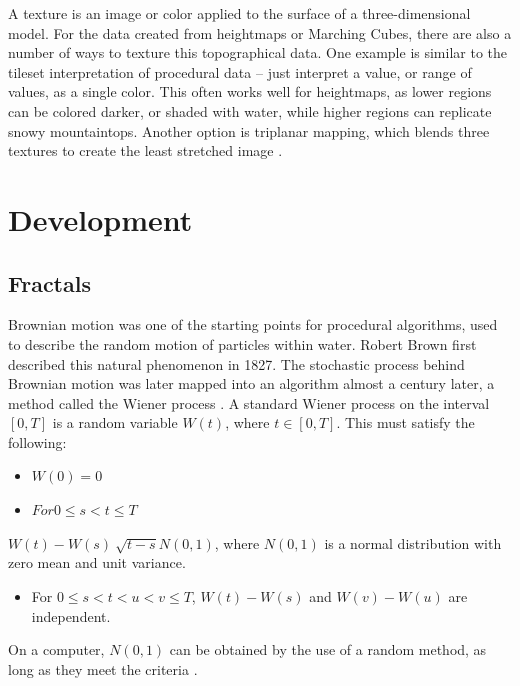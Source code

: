 \documentclass[10pt]{report}
\begin{document}
		A texture is an image or color applied to the surface of a three-dimensional model. For the data created from heightmaps or Marching Cubes, there are also a number of ways to texture this topographical data. One example is similar to the tileset interpretation of procedural data -- just interpret a value, or range of values, as a single color. This often works well for heightmaps, as lower regions can be colored darker, or shaded with water, while higher regions can replicate snowy mountaintops. Another option is triplanar mapping, which blends three textures to create the least stretched image \cite{triplanar, marching-cubes}.  
		
	\vspace{10pt}
	\let\clearpage\relax
	\chapter{Development}
		
		\section{Fractals}
		Brownian motion was one of the starting points for procedural algorithms, used to describe the random motion of particles within water. Robert Brown first described this natural phenomenon in 1827. The stochastic process behind Brownian motion was later mapped into an algorithm almost a century later, a method called the Wiener process \cite{inbook}. A standard Wiener process on the interval \([0,T]\) is a random variable \(W(t)\), where \(t \in [0,T]\). This must satisfy the following:
		
		\begin{itemize}
			\item \(W(0) = 0\)
			\item \(For 0 \leq s < t \leq T\) 
		\end{itemize}
		
		\(W(t) - W(s) ~ \sqrt{t - s} N(0,1)\), where \(N(0,1)\) is a normal distribution with zero mean and unit variance. 
		
		\begin{itemize}
			\item For \( 0 \leq s < t < u < v \leq T\), \(W(t) - W(s)\) and \(W(v) - W(u)\) are independent.
		\end{itemize}
		
		On a computer, \(N(0,1)\) can be obtained by the use of a random method, as long as they meet the criteria \cite{wiener-process}. 
		
\end{document}
